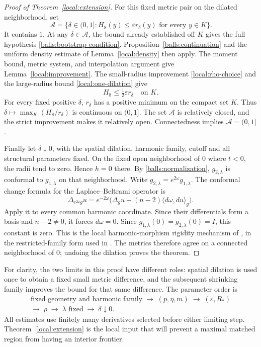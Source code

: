 \documentclass[11pt]{article}
\theoremstyle{definition}
\theoremstyle{remark}
\numberwithin{equation}{section}
\begin{document}
\begin{proof}[Proof of Theorem~\ref{local:extension}]
For this fixed metric pair on the dilated neighborhood, set
\[
 \mathcal A=\{\delta\in(0,1]:
        H_8(y)\leq\varepsilon r_\delta(y)\text{ for every }y\in K\}.
\]
It contains $1$.  At any $\delta\in\mathcal A$, the bound already
established off $K$ gives the full hypothesis
\eqref{balls:bootstrap-condition}.  Proposition~\ref{balls:continuation}
and the uniform density estimate of Lemma~\ref{local:density} then apply.
The moment bound, metric system, and interpolation argument give
Lemma~\ref{local:improvement}.
The small-radius improvement \eqref{local:rho-choice} and the
large-radius bound \eqref{local:one-dilation} give
\[
 H_8\leq\tfrac12\varepsilon r_\delta\quad\text{on }K.
\]
For every fixed positive $\delta$, $r_\delta$ has a positive minimum
on the compact set $K$.  Thus
$\delta\mapsto\max_K(H_8/r_\delta)$ is continuous on $(0,1]$.
The set $\mathcal A$ is relatively closed, and the strict improvement
makes it relatively open.  Connectedness implies
$\mathcal A=(0,1]$.

Finally let $\delta\downarrow0$, with the spatial dilation, harmonic
family, cutoff and all structural parameters fixed.  On the fixed
open neighborhood of $0$ where $t<0$, the radii tend to zero.  Hence
$h=0$ there.  By \eqref{balls:normalization}, $g_{2,\lambda}$ is
conformal to $g_{1,\lambda}$ on that neighborhood.  Write
$g_{2,\lambda}=e^{2\omega}g_{1,\lambda}$.  The conformal change formula
for the Laplace--Beltrami operator is
\[
 \Delta_{e^{2\omega}g}u
  =e^{-2\omega}\bigl(\Delta_g u
                 +(n-2)\langle d\omega,du\rangle_g\bigr).
\]
Apply it to every common harmonic coordinate.  Since their
differentials form a basis and $n-2\ne0$, it forces $d\omega=0$.
Since $g_{1,\lambda}(0)=g_{2,\lambda}(0)=I$, this constant is zero.
This is the local harmonic-morphism rigidity mechanism of
\citep[Section~8]{Fuglede1978}, in the restricted-family form used in
\citep[Proposition~4.1]{LLS20}.
The metrics therefore agree on a connected neighborhood of $0$;
undoing the dilation proves the theorem.
\end{proof}

For clarity, the two limits in this proof have different roles:
spatial dilation is used once to obtain a fixed small metric
difference, and the subsequent shrinking family improves the bound
for that same difference.  The parameter order is
\begin{equation}\label{local:parameter-order}
 \begin{gathered}
 \text{fixed geometry and harmonic family}
   \;\longrightarrow\;(p,\eta,m)
   \;\longrightarrow\;(\varepsilon,R_*)\\
 \longrightarrow\;\rho\;\longrightarrow\;
 \lambda\text{ fixed}\;\longrightarrow\;\delta\downarrow0.
 \end{gathered}
\end{equation}
All estimates use finitely many derivatives selected before either
limiting step.  Theorem~\ref{local:extension} is the local input that
will prevent a maximal matched region from having an interior
frontier.
\end{document}
